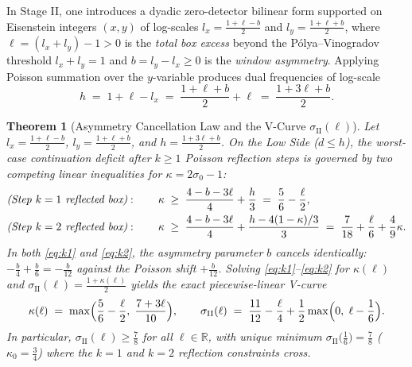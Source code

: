 \documentclass[11pt]{amsart}
\newtheorem{theorem}{Theorem}[section]
\theoremstyle{definition}
\theoremstyle{remark}
\begin{document}
In Stage II, one introduces a dyadic zero-detector bilinear form supported on Eisenstein integers $(x, y)$ of log-scales $l_x = \frac{1 + \ell - b}{2}$ and $l_y = \frac{1 + \ell + b}{2}$, where $\ell = (l_x + l_y) - 1 > 0$ is the \emph{total box excess} beyond the P\'olya--Vinogradov threshold $l_x + l_y = 1$ and $b = l_y - l_x \ge 0$ is the \emph{window asymmetry}. Applying Poisson summation over the $y$-variable produces dual frequencies of log-scale
\[
  h \;=\; 1 + \ell - l_x \;=\; \frac{1 + \ell + b}{2} + \ell \;=\; \frac{1 + 3\ell + b}{2}.
\]

\begin{theorem}[Asymmetry Cancellation Law and the V-Curve $\sigma_{\mathrm{II}}(\ell)$]\label{thm:v-curve}
Let $l_x = \frac{1 + \ell - b}{2}$, $l_y = \frac{1 + \ell + b}{2}$, and $h = \frac{1 + 3\ell + b}{2}$. On the Low Side ($d \le h$), the worst-case continuation deficit after $k \ge 1$ Poisson reflection steps is governed by two competing linear inequalities for $\kappa = 2\sigma_0 - 1$:
\begin{align}
  \text{\emph{(Step $k = 1$ reflected box)}}:\qquad \kappa &\;\ge\; \frac{4 - b - 3\ell}{4} + \frac{h}{3} \;=\; \frac{5}{6} - \frac{\ell}{2},\label{eq:k1}\\
  \text{\emph{(Step $k = 2$ reflected box)}}:\qquad \kappa &\;\ge\; \frac{4 - b - 3\ell}{4} + \frac{h - 4(1 - \kappa)/3}{3} \;=\; \frac{7}{18} + \frac{\ell}{6} + \frac{4}{9}\kappa.\label{eq:k2}
\end{align}
In both \eqref{eq:k1} and \eqref{eq:k2}, the asymmetry parameter $b$ cancels identically: $-\frac{b}{4} + \frac{b}{6} = -\frac{b}{12}$ against the Poisson shift $+\frac{b}{12}$. Solving \eqref{eq:k1}--\eqref{eq:k2} for $\kappa(\ell)$ and $\sigma_{\mathrm{II}}(\ell) = \frac{1 + \kappa(\ell)}{2}$ yields the exact piecewise-linear V-curve
\begin{equation}\label{eq:v-curve}
  \kappa(\ell) \;=\; \max\Bigl(\frac{5}{6} - \frac{\ell}{2},\; \frac{7 + 3\ell}{10}\Bigr),
  \qquad
  \sigma_{\mathrm{II}}(\ell) \;=\; \frac{11}{12} - \frac{\ell}{4} + \frac{1}{2}\max\Bigl(0,\; \ell - \frac{1}{6}\Bigr).
\end{equation}
In particular, $\sigma_{\mathrm{II}}(\ell) \ge \frac{7}{8}$ for all $\ell \in \mathbb{R}$, with unique minimum $\sigma_{\mathrm{II}}\bigl(\frac{1}{6}\bigr) = \frac{7}{8}$ ($\kappa_0 = \frac{3}{4}$) where the $k = 1$ and $k = 2$ reflection constraints cross.
\end{theorem}
\end{document}
